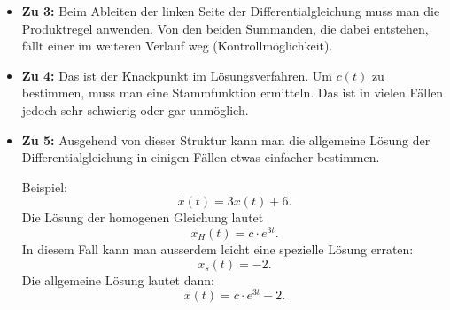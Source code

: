 \begin{itemize}
    \item \textbf{Zu 3:} Beim Ableiten der linken Seite der
          Differentialgleichung muss man die Produktregel
          anwenden. Von den beiden Summanden, die dabei
          entstehen, fällt einer im weiteren Verlauf weg
          (Kontrollmöglichkeit).

    \item \textbf{Zu 4:} Das ist der Knackpunkt im
          Lösungsverfahren. Um \(c(t)\) zu bestimmen,
          muss man eine Stammfunktion ermitteln.
          Das ist in vielen Fällen jedoch sehr schwierig
          oder gar unmöglich.

    \item \textbf{Zu 5:} Ausgehend von dieser Struktur
          kann man die allgemeine Lösung der
          Differentialgleichung in einigen Fällen
          etwas einfacher bestimmen.

          Beispiel:
          \[
              \dot{x}(t)=3x(t)+6.
          \]
          Die Lösung der homogenen Gleichung lautet
          \[
              x_H(t)=c\cdot e^{3t}.
          \]
          In diesem Fall kann man ausserdem leicht
          eine spezielle Lösung erraten:
          \[
              x_s(t)=-2.
          \]
          Die allgemeine Lösung lautet dann:
          \[
              x(t)=c\cdot e^{3t}-2.
          \]
\end{itemize}


